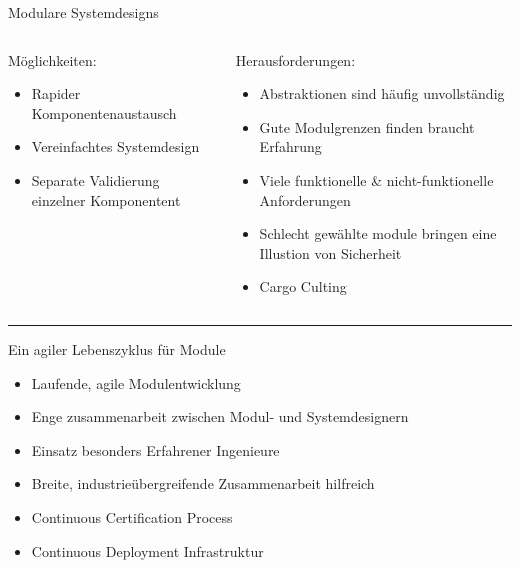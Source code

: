 
\begin{frame}{Modulare Systemdesigns}
  \begin{columns}[t,fullwidth]
    \begin{column}{.3\linewidth}
      Möglichkeiten:
      \tiny
      \vspace{0.5em}
      \begin{itemize}
        \item Rapider Komponentenaustausch
        \item Vereinfachtes Systemdesign
        \item Separate Validierung einzelner Komponentent
      \end{itemize}
    \end{column}

    \vrule

    \begin{column}{.65\linewidth}
      Herausforderungen:
      \tiny
      \vspace{0.5em}
      \begin{itemize}
        \item Abstraktionen sind häufig unvollständig
        \item Gute Modulgrenzen finden braucht Erfahrung
        \item Viele funktionelle \& nicht-funktionelle Anforderungen
        \item Schlecht gewählte module bringen eine Illustion von Sicherheit
        \item Cargo Culting
      \end{itemize}
    \end{column}

  \end{columns}

  \hrule

  Ein agiler Lebenszyklus für Module

    \tiny
  \begin{itemize}
    \item Laufende, agile Modulentwicklung
    \item Enge zusammenarbeit zwischen Modul- und Systemdesignern
    \item Einsatz besonders Erfahrener Ingenieure
    \item Breite, industrieübergreifende Zusammenarbeit hilfreich
    \item Continuous Certification Process
    \item Continuous Deployment Infrastruktur
  \end{itemize}

\end{frame}


